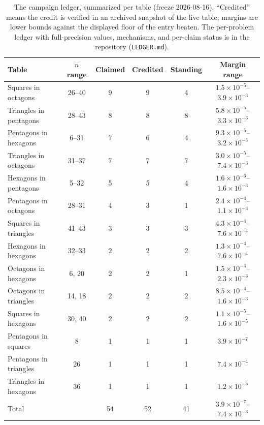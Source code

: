 \documentclass[11pt]{article}
\begin{document}
\begin{table}[t]
\centering\small
\caption{The campaign ledger, summarized per table (freeze 2026-08-16).
``Credited'' means the credit is verified in an archived snapshot of the live
table; margins are lower bounds against the displayed floor of the entry
beaten. The per-problem ledger with full-precision values, mechanisms, and
per-claim status is in the repository (\texttt{LEDGER.md}).}
\label{tab:ledger}
\begin{tabular}{lccccc}
\toprule
Table & $n$ range & Claimed & Credited & Standing & Margin range \\
\midrule
Squares in octagons     & 26--40 & 9 & 9 & 4 & $1.5\times10^{-5}$--$3.9\times10^{-3}$ \\
Triangles in pentagons  & 28--43 & 8 & 8 & 8 & $5.8\times10^{-5}$--$3.3\times10^{-3}$ \\
Pentagons in hexagons   & 6--31  & 7 & 6 & 4 & $9.3\times10^{-5}$--$3.2\times10^{-3}$ \\
Triangles in octagons   & 31--37 & 7 & 7 & 7 & $3.0\times10^{-5}$--$7.4\times10^{-3}$ \\
Hexagons in pentagons   & 5--32  & 5 & 5 & 4 & $1.6\times10^{-6}$--$1.6\times10^{-3}$ \\
Pentagons in octagons   & 28--31 & 4 & 3 & 1 & $2.4\times10^{-4}$--$1.1\times10^{-3}$ \\
Squares in triangles    & 41--43 & 3 & 3 & 3 & $4.3\times10^{-4}$--$7.6\times10^{-4}$ \\
Hexagons in hexagons    & 32--33 & 2 & 2 & 2 & $1.3\times10^{-4}$--$7.6\times10^{-4}$ \\
Octagons in hexagons    & 6, 20  & 2 & 2 & 1 & $1.5\times10^{-4}$--$2.3\times10^{-3}$ \\
Octagons in triangles   & 14, 18 & 2 & 2 & 2 & $8.5\times10^{-4}$--$1.6\times10^{-3}$ \\
Squares in hexagons     & 30, 40 & 2 & 2 & 2 & $1.1\times10^{-5}$--$1.6\times10^{-5}$ \\
Pentagons in squares    & 8      & 1 & 1 & 1 & $3.9\times10^{-7}$ \\
Pentagons in triangles  & 26     & 1 & 1 & 1 & $7.4\times10^{-4}$ \\
Triangles in hexagons   & 36     & 1 & 1 & 1 & $1.2\times10^{-5}$ \\
\midrule
Total & & 54 & 52 & 41 & $3.9\times10^{-7}$--$7.4\times10^{-3}$ \\
\bottomrule
\end{tabular}
\end{table}
\end{document}
